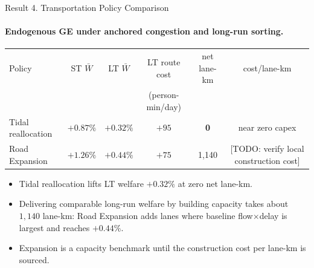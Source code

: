 \documentclass[11pt,aspectratio=169]{beamer}
\newcommand{\good}[1]{\textcolor{blue!70!black}{#1}}
\newcommand{\app}[1]{\allowbreak\hspace{0.25em}\hyperlink{#1}{\beamergotobutton{details}}}
\begin{document}
\begin{frame}[label=result4]{Result 4. Transportation Policy Comparison}
\framesubtitle{Endogenous GE under anchored congestion and long-run sorting.}
\begin{center}\scriptsize
\begin{tabular}{lccccc}
\toprule
Policy & ST $\bar W$ & LT $\bar W$ & LT route cost & net lane-km & cost/lane-km \\
 &  &  & (person-min/day) &  &  \\
\midrule
Tidal reallocation & $+0.87\%$ & $+0.32\%$ & $+95$ & \good{\textbf{0}} & near zero capex \\
Road Expansion & $+1.26\%$ & $+0.44\%$ & $+75$ & 1{,}140 & [TODO: verify local construction cost] \\
\bottomrule
\end{tabular}
\end{center}
\vspace{0.3em}
\begin{itemize}\footnotesize
  \item Tidal reallocation lifts LT welfare $+0.32\%$ at zero net lane-km.
  \item Delivering comparable long-run welfare by building capacity takes about $1{,}140$ lane-km: Road Expansion adds lanes where baseline flow$\times$delay is largest and reaches $+0.44\%$.
  \item Expansion is a capacity benchmark until the construction cost per lane-km is sourced. \app{apppolicy}
\end{itemize}
\end{frame}
\end{document}
